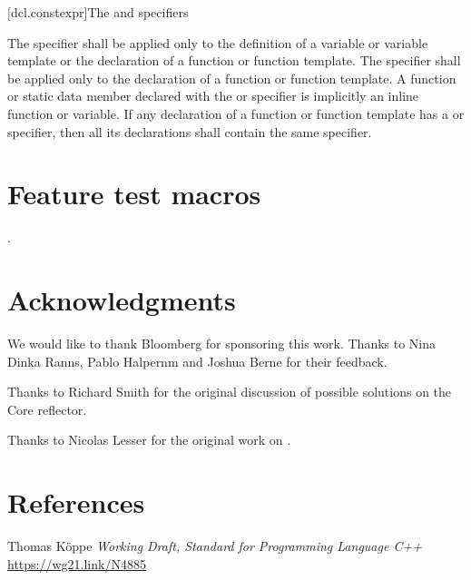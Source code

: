 \documentclass{wg21}
\begin{document}
[dcl.constexpr]{The  and  specifiers}%

\pnum
The  specifier shall be applied only to
the definition of a variable or variable template or
the declaration of a function or function template.
The  specifier shall be applied only to
the declaration of a function or function template.
A function or static data member
declared with the  or  specifier
is implicitly an inline function or variable.
If any declaration of a function or function template has
a  or  specifier,
then all its declarations shall contain the same specifier.


\section{Feature test macros}

.


\section{Acknowledgments}

We would like to thank Bloomberg for sponsoring this work.
Thanks to Nina Dinka Ranns, Pablo Halpernm and Joshua Berne for their feedback.

Thanks to Richard Smith for the original discussion of possible solutions on the Core reflector.

Thanks to Nicolas Lesser for the original work on .

\section{References}

\renewcommand{\section}[2]{}%



\begin{thebibliography}{9}

Thomas Köppe
\emph{Working Draft, Standard for Programming Language C++}\newline
\url{https://wg21.link/N4885}


\end{thebibliography}
\end{document}
